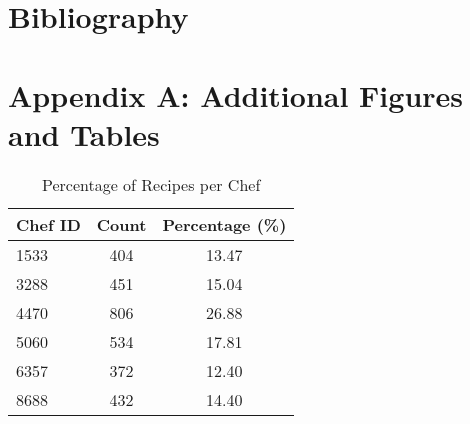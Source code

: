 \documentclass[twocolumn,10pt]{article}
\begin{document}
\section*{Bibliography}




\appendix

\section*{Appendix A: Additional Figures and Tables}

\begin{table}[h!]
\centering
\caption{Percentage of Recipes per Chef}
\begin{tabular}{lcc}
\toprule
Chef ID & Count & Percentage (\%) \\
\midrule
1533 & 404 & 13.47 \\
3288 & 451 & 15.04 \\
4470 & 806 & 26.88 \\
5060 & 534 & 17.81 \\
6357 & 372 & 12.40 \\
8688 & 432 & 14.40 \\
\bottomrule
\end{tabular}
\end{table}
\end{document}
